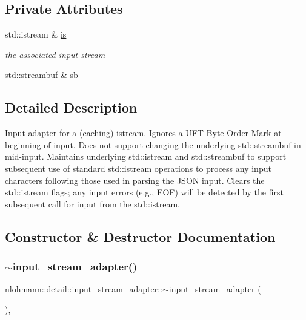 \subsection*{Private Attributes}
\begin{DoxyCompactItemize}
\item 
std\+::istream \& \hyperlink{classnlohmann_1_1detail_1_1input__stream__adapter_ac3afada8eaf7d6cd2b475a3388d5e992}{is}
\begin{DoxyCompactList}\small\item\em the associated input stream \end{DoxyCompactList}\item 
std\+::streambuf \& \hyperlink{classnlohmann_1_1detail_1_1input__stream__adapter_addd96de4b5cbd9925ed5d8a0f0261143}{sb}
\end{DoxyCompactItemize}


\subsection{Detailed Description}
Input adapter for a (caching) istream. Ignores a U\+FT Byte Order Mark at beginning of input. Does not support changing the underlying std\+::streambuf in mid-\/input. Maintains underlying std\+::istream and std\+::streambuf to support subsequent use of standard std\+::istream operations to process any input characters following those used in parsing the J\+S\+ON input. Clears the std\+::istream flags; any input errors (e.\+g., E\+OF) will be detected by the first subsequent call for input from the std\+::istream. 

\subsection{Constructor \& Destructor Documentation}
\mbox{\label{classnlohmann_1_1detail_1_1input__stream__adapter_a2d71eb469267abd864f765481d1e823f}} 
\subsubsection{\texorpdfstring{$\sim$input\+\_\+stream\+\_\+adapter()}{~input\_stream\_adapter()}}
{\footnotesize\ttfamily nlohmann\+::detail\+::input\+\_\+stream\+\_\+adapter\+::$\sim$input\+\_\+stream\+\_\+adapter (\begin{DoxyParamCaption}{ }\end{DoxyParamCaption})\hspace{0.3cm}{\ttfamily [inline]}, {\ttfamily [override]}}

